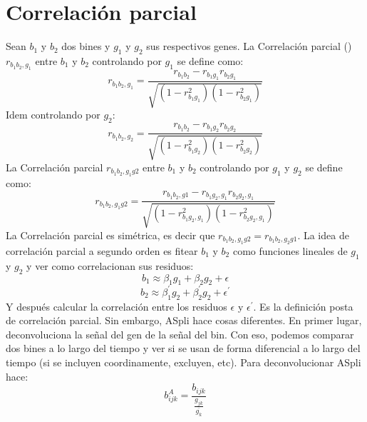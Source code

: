 \documentclass[a4paper,10pt]{book}
\begin{document}
\section{Correlación parcial}
Sean $b_1$ y $b_2$ dos bines y $g_1$ y $g_2$ sus respectivos genes.\newline
La Correlación parcial (\cite{chen09}\cite{zuo14}) $r_{b_1b_2,g_1}$ entre $b_1$ y $b_2$ controlando por $g_1$ se define como:
\begin{equation} \label{eq:correlacion_parcial_orden_1_a}
r_{b_1b_2,g_1}=\frac{r_{b_1b_2}-r_{b_1g_1}r_{b_2g_1}}{\sqrt{(1-r_{b_1g_1}^2)(1-r_{b_2g_1}^2)}}
\end{equation}
Idem controlando por $g_2$:
\begin{equation} \label{eq:correlacion_parcial_orden_1_b}
r_{b_1b_2,g_2}=\frac{r_{b_1b_2}-r_{b_1g_2}r_{b_2g_2}}{\sqrt{(1-r_{b_1g_2}^2)(1-r_{b_2g_2}^2)}}
\end{equation}
La Correlación parcial $r_{b_1b_2,g_1g2}$ entre $b_1$ y $b_2$ controlando por $g_1$ y $g_2$ se define como:
\begin{equation} \label{eq:correlacion_parcial_orden_2}
r_{b_1b_2,g_1g2}=\frac{r_{b_1b_2,g1}-r_{b_1g_2,g_1}r_{b_2g_2,g_1}}{\sqrt{(1-r_{b_1g_2,g_1}^2)(1-r_{b_2g_2,g_1}^2)}}
\end{equation}
La Correlación parcial es simétrica, es decir que $r_{b_1b_2,g_1g2}=r_{b_1b_2,g_2g1}$.\newline
La idea de correlación parcial a segundo orden es fitear $b_1$ y $b_2$ como funciones lineales de $g_1$ y $g_2$ y ver como correlacionan sus residuos:
\begin{equation} \label{eq:ajuste_lineal_correlacion_parcial_a}
b_1 \approx \beta_1 g_1 + \beta_2 g_2 + \epsilon
\end{equation}
\begin{equation} \label{eq:ajuste_lineal_correlacion_parcial_b}
b_2 \approx \beta_1^\prime g_2 + \beta_2^\prime g_2 + \epsilon^\prime
\end{equation}
Y después calcular la correlación entre los residuos $\epsilon$ y $\epsilon^\prime$. Es la definición posta de correlación parcial.\newline
Sin embargo, ASpli hace cosas diferentes. En primer lugar, deconvoluciona la señal del gen de la señal del bin. Con eso, podemos comparar dos bines a lo largo del tiempo y ver si se usan de forma 
diferencial a lo largo del tiempo (si se incluyen coordinamente, excluyen, etc). Para deconvolucionar ASpli hace:
\begin{equation} \label{eq:normalizacion_aspli}
b_{ijk}^A = \frac{b_{ijk}}{\frac{g_{jk}}{\overline{g_{k}}}}
\end{equation}
\end{document}
